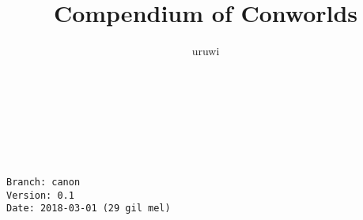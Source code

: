 \documentclass{book}
\title{Compendium of Conworlds}
\author{uruwi}
\begin{document}
\pagecolor{Goldenrod!25}

\begin{titlepage}
    \makeatletter
    \begin{center}
        {\color{RedOrange} \hprule \vspace{1.5ex} \\}
        {\Huge \textcolor{BrickRed}{\@title}\\}
        {\color{RedOrange} \hprule \vspace{1.5ex} \\}
        \vspace{1.5cm}
        {\Large\bfseries \@author}\\[5pt]
        \vspace{2cm}
        \vfill
        \vfill
        {\@date}
    \end{center}
    \makeatother
\end{titlepage}

\pagecolor{Goldenrod!15}

\begin{verbatim}
Branch: canon
Version: 0.1
Date: 2018-03-01 (29 gil mel)
\end{verbatim}
\end{document}
